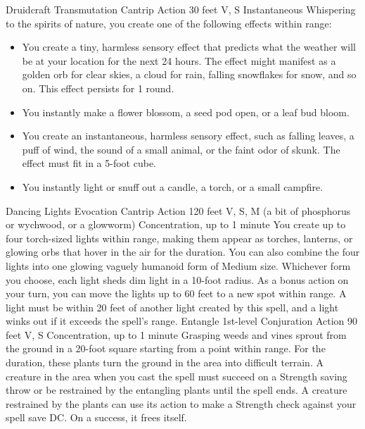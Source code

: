 \documentclass[a4paper,10pt,bg=print]{dndbook} %
\begin{document}
	\DndSpellHeader
	{Druidcraft}
	{Transmutation Cantrip}
	{Action}
	{30 feet}
	{V, S}
	{Instantaneous}
	Whispering to the spirits of nature, you create one of the following effects within range:
	\begin{itemize}
		\item You create a tiny, harmless sensory effect that predicts what the weather will be at your location for the next 24 hours. The effect might manifest as a golden orb for clear skies, a cloud for rain, falling snowflakes for snow, and so on. This effect persists for 1 round.
		\item You instantly make a flower blossom, a seed pod open, or a leaf bud bloom.
		\item You create an instantaneous, harmless sensory effect, such as falling leaves, a puff of wind, the sound of a small animal, or the faint odor of skunk. The effect must fit in a 5-foot cube.
		\item You instantly light or snuff out a candle, a torch, or a small campfire.
	\end{itemize}
	\DndSpellHeader
	{Dancing Lights}
	{Evocation Cantrip}
	{Action}
	{120 feet}
	{V, S, M (a bit of phosphorus or wychwood, or a glowworm)}
	{Concentration, up to 1 minute}
	You create up to four torch-sized lights within range, making them appear as torches, lanterns, or glowing orbs that hover in the air for the duration. You can also combine the four lights into one glowing vaguely humanoid form of Medium size. Whichever form you choose, each light sheds dim light in a 10-foot radius.\linebreak
	As a bonus action on your turn, you can move the lights up to 60 feet to a new spot within range. A light must be within 20 feet of another light created by this spell, and a light winks out if it exceeds the spell’s range.\linebreak
	\pagebreak
	\DndSpellHeader
	{Entangle}
	{1st-level Conjuration}
	{Action}
	{90 feet}
	{V, S}
	{Concentration, up to 1 minute}
	Grasping weeds and vines sprout from the ground in a 20-foot square starting from a point within range. For the duration, these plants turn the ground in the area into difficult terrain.\linebreak
	A creature in the area when you cast the spell must succeed on a Strength saving throw or be restrained by the entangling plants until the spell ends. A creature restrained by the plants can use its action to make a Strength check against your spell save DC. On a success, it frees itself.\linebreak
\end{document}
